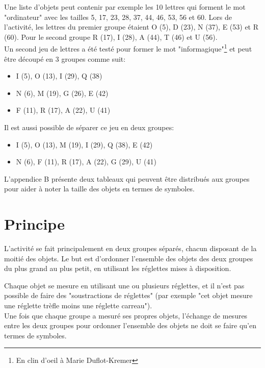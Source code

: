 \documentclass[a4paper,12pt]{scrartcl}
\begin{document}
Une liste d'objets peut contenir par exemple les 10 lettres qui forment le mot "ordinateur" avec les tailles 5, 17, 23, 28, 37, 44, 46, 53, 56 et 60.
%
Lors de l'activité, les lettres du premier groupe étaient O (5), D (23), N (37), E (53) et R (60). Pour le second groupe R (17), I (28), A (44), T (46) et U (56).\\


Un second jeu de lettres a été testé pour former le mot "informagique"\footnote{En clin d'oeil à Marie Duflot-Kremer} et peut être découpé en 3 groupes comme suit:
\begin{itemize}
    \item I (5), O (13), I (29), Q (38)
    \item N (6), M (19), G (26), E (42)
    \item F (11), R (17), A (22), U (41)
\end{itemize}
\medskip
Il est aussi possible de séparer ce jeu en deux groupes:
\begin{itemize}
    \item I (5), O (13), M (19), I (29), Q (38), E (42)
    \item N (6), F (11), R (17), A (22), G (29), U (41)
\end{itemize}

\bigskip
L'appendice B présente deux tableaux qui peuvent être distribués aux groupes pour aider à noter la taille des objets en termes de symboles.



\section{Principe}

L'activité se fait principalement en deux groupes séparés, chacun disposant de la moitié des objets.
Le but est d'ordonner l'ensemble des objets des deux groupes du plus grand au plus petit, en utilisant les réglettes mises à disposition.

Chaque objet se mesure en utilisant une ou plusieurs réglettes, et il n'est pas possible de faire des "soustractions de réglettes" (par exemple "cet objet mesure une réglette trèfle moins une réglette carreau").\\


Une fois que chaque groupe a mesuré ses propres objets, l'échange de mesures entre les deux groupes pour ordonner l'ensemble des objets ne doit se faire qu'en termes de symboles.
\end{document}
